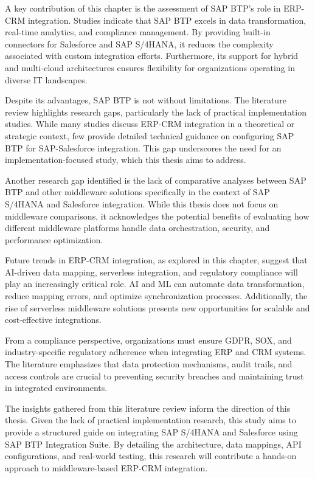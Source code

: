 A key contribution of this chapter is the assessment of SAP BTP's role in ERP-CRM integration. Studies indicate that SAP BTP excels in data transformation, real-time analytics, and compliance management. By providing built-in connectors for Salesforce and SAP S/4HANA, it reduces the complexity associated with custom integration efforts. Furthermore, its support for hybrid and multi-cloud architectures ensures flexibility for organizations operating in diverse IT landscapes.

Despite its advantages, SAP BTP is not without limitations. The literature review highlights research gaps, particularly the lack of practical implementation studies. While many studies discuss ERP-CRM integration in a theoretical or strategic context, few provide detailed technical guidance on configuring SAP BTP for SAP-Salesforce integration. This gap underscores the need for an implementation-focused study, which this thesis aims to address.

Another research gap identified is the lack of comparative analyses between SAP BTP and other middleware solutions specifically in the context of SAP S/4HANA and Salesforce integration. While this thesis does not focus on middleware comparisons, it acknowledges the potential benefits of evaluating how different middleware platforms handle data orchestration, security, and performance optimization.

Future trends in ERP-CRM integration, as explored in this chapter, suggest that AI-driven data mapping, serverless integration, and regulatory compliance will play an increasingly critical role. AI and ML can automate data transformation, reduce mapping errors, and optimize synchronization processes. Additionally, the rise of serverless middleware solutions presents new opportunities for scalable and cost-effective integrations.

From a compliance perspective, organizations must ensure GDPR, SOX, and industry-specific regulatory adherence when integrating ERP and CRM systems. The literature emphasizes that data protection mechanisms, audit trails, and access controls are crucial to preventing security breaches and maintaining trust in integrated environments.

The insights gathered from this literature review inform the direction of this thesis. Given the lack of practical implementation research, this study aims to provide a structured guide on integrating SAP S/4HANA and Salesforce using SAP BTP Integration Suite. By detailing the architecture, data mappings, API configurations, and real-world testing, this research will contribute a hands-on approach to middleware-based ERP-CRM integration.

